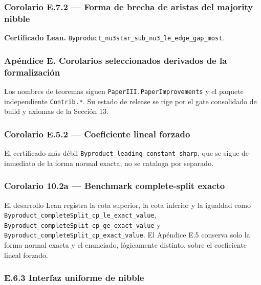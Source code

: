 \documentclass[spanish,11pt,a4paper]{article}
\begin{document}
\subsubsection{Corolario E.7.2 --- Forma de brecha de aristas del
majority
nibble}\label{corolario-e.7.2-forma-de-brecha-de-aristas-del-majority-nibble}

\textbf{Certificado Lean.}
\nolinkurl{Byproduct_nu3star_sub_nu3_le_edge_gap_most}.

\subsubsection{Apéndice E. Corolarios seleccionados derivados de la
formalización}\label{apuxe9ndice-e.-corolarios-seleccionados-derivados-de-la-formalizaciuxf3n}

Los nombres de teoremas siguen \nolinkurl{PaperIII.PaperImprovements} y el
paquete independiente \nolinkurl{Contrib.*}. Su estado de release se rige
por el gate consolidado de build y axiomas de la Sección 13.

\subsubsection{Corolario E.5.2 --- Coeficiente lineal
forzado}\label{corolario-e.5.2-coeficiente-lineal-forzado-1}

El certificado más débil \nolinkurl{Byproduct_leading_constant_sharp},
que se sigue de inmediato de la forma normal exacta, no se cataloga por
separado.

\subsubsection{Corolario 10.2a --- Benchmark complete-split
exacto}\label{corolario-10.2a-benchmark-complete-split-exacto}

El desarrollo Lean registra la cota superior, la cota inferior y la
igualdad como \nolinkurl{Byproduct_completeSplit_cp_le_exact_value},
\nolinkurl{Byproduct_completeSplit_cp_ge_exact_value} y
\nolinkurl{Byproduct_completeSplit_cp_exact_value}. El Apéndice E.5
conserva solo la forma normal exacta y el enunciado, lógicamente
distinto, sobre el coeficiente lineal forzado.

\subsubsection{E.6.3 Interfaz uniforme de
nibble}\label{e.6.3-interfaz-uniforme-de-nibble-1}
\end{document}
